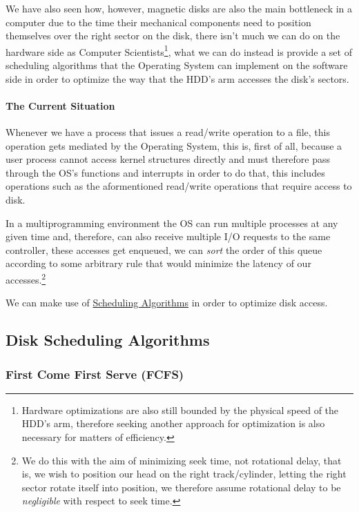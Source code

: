 \documentclass[openright, twoside]{report}
\theoremstyle{definition}
\theoremstyle{example}
\begin{document}
We have also seen how, however, magnetic disks are also the main bottleneck 
in a computer due to the time their mechanical components need 
to position themselves over the right sector on the disk, there
isn't much we can do on the hardware side as Computer Scientists\footnote{
	Hardware optimizations are also still bounded by the physical speed of the HDD's arm,
	therefore seeking another approach for optimization is also necessary for matters of 
	efficiency.
}, what we can do instead is provide a set of scheduling algorithms that the Operating System
can implement on the software side in order to optimize the way that the HDD's arm accesses 
the disk's sectors.

\paragraph{The Current Situation}
Whenever we have a process that issues a read/write operation to a file, this operation gets 
mediated by the Operating System, this is, first of all, because a user process cannot 
access kernel structures directly and must therefore pass through the OS's functions and 
interrupts in order to do that, this includes operations such as the aformentioned read/write 
operations that require access to disk.

In a multiprogramming environment the OS can run multiple processes at any given time and,
therefore, can also receive multiple I/O requests to the same controller, these accesses get 
enqueued, we can \emph{sort} the order of this queue according to some arbitrary rule that 
would minimize the latency of our accesses.\footnote{We do this with the aim of 
minimizing seek time, not rotational delay, that is, we wish to position our head on 
the right track/cylinder, letting the right sector rotate itself into position, we therefore 
assume rotational delay to be \emph{negligible} with respect to seek time.}

\begin{center}
	We can make use of \hyperref[sec:scheduling_alg]{Scheduling Algorithms} in order to 
	optimize disk access.
\end{center}

\subsection{Disk Scheduling Algorithms}
\subsubsection{First Come First Serve (FCFS)}
\end{document}

